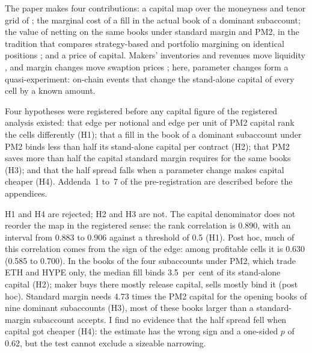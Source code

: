 \documentclass[a4paper,fleqn]{cas-dc}
\begin{document}
The paper makes four contributions: a capital map over the moneyness and tenor grid of \citet{albiez2026}; the
marginal cost of a fill in the actual book of a dominant subaccount; the value of netting on the same books
under standard margin and PM2, in the tradition that compares strategy-based and portfolio margining on
identical positions \citep{kupiec1996}; and a price of capital. Makers' inventories and revenues move
liquidity \citep{comertonforde2010}, and margin changes move swaption prices \citep{ahn2025}; here, parameter
changes form a quasi-experiment: on-chain events that change the stand-alone capital of every cell by a known
amount.

Four hypotheses were registered before any capital figure of the registered analysis existed: that edge per
notional and edge per unit of PM2 capital rank the cells differently (H1); that a fill in the book of a
dominant subaccount under PM2 binds less than half its stand-alone capital per contract (H2); that PM2 saves
more than half the capital standard margin requires for the same books (H3); and that the half spread falls
when a parameter change makes capital cheaper (H4). Addenda~1 to~7 of the pre-registration are described
before the appendices.

H1 and H4 are rejected; H2 and H3 are not. The capital denominator does not reorder the map in the registered
sense: the rank correlation is 0.890, with an interval from 0.883 to 0.906 against a threshold of 0.5 (H1).
Post hoc, much of this correlation comes from the sign of the edge: among profitable cells it is 0.630 (0.585
to 0.700). In the books of the four subaccounts under PM2, which trade ETH and HYPE only, the median fill binds
3.5~per~cent of its stand-alone capital (H2); maker buys there mostly release capital, sells mostly bind it (post hoc).
Standard margin needs 4.73 times the PM2 capital for the opening books of nine dominant subaccounts (H3), most
of these books larger than a standard-margin subaccount accepts. I find no evidence that the half spread fell when
capital got cheaper (H4): the estimate has the wrong sign and a one-sided $p$ of 0.62, but the test cannot
exclude a sizeable narrowing.
\end{document}

